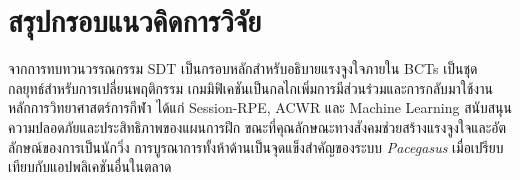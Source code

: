 \section{สรุปกรอบแนวคิดการวิจัย}

จากการทบทวนวรรณกรรม SDT เป็นกรอบหลักสำหรับอธิบายแรงจูงใจภายใน BCTs เป็นชุดกลยุทธ์สำหรับการเปลี่ยนพฤติกรรม เกมมิฟิเคชันเป็นกลไกเพิ่มการมีส่วนร่วมและการกลับมาใช้งาน หลักการวิทยาศาสตร์การกีฬา ได้แก่ Session-RPE, ACWR และ Machine Learning สนับสนุนความปลอดภัยและประสิทธิภาพของแผนการฝึก ขณะที่คุณลักษณะทางสังคมช่วยสร้างแรงจูงใจและอัตลักษณ์ของการเป็นนักวิ่ง การบูรณาการทั้งห้าด้านเป็นจุดแข็งสำคัญของระบบ \textit{Pacegasus} เมื่อเปรียบเทียบกับแอปพลิเคชันอื่นในตลาด
